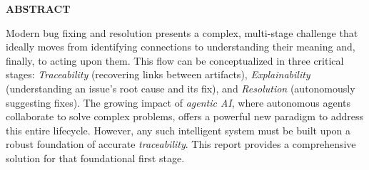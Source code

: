 \begin{center}
    {\Large\textbf{ABSTRACT}}\\[0.2in]
\end{center}


\vspace{0.2in}

\noindent
Modern bug fixing and resolution presents a complex, multi-stage challenge that ideally moves from identifying connections to understanding their meaning and, finally, to acting upon them. This flow can be conceptualized in three critical stages: \emph{Traceability} (recovering links between artifacts), \emph{Explainability} (understanding an issue's root cause and its fix), and \emph{Resolution} (autonomously suggesting fixes). The growing impact of \emph{agentic AI}, where autonomous agents collaborate to solve complex problems, offers a powerful new paradigm to address this entire lifecycle. However, any such intelligent system must be built upon a robust foundation of accurate \emph{traceability}. This report provides a comprehensive solution for that foundational first stage.\\

